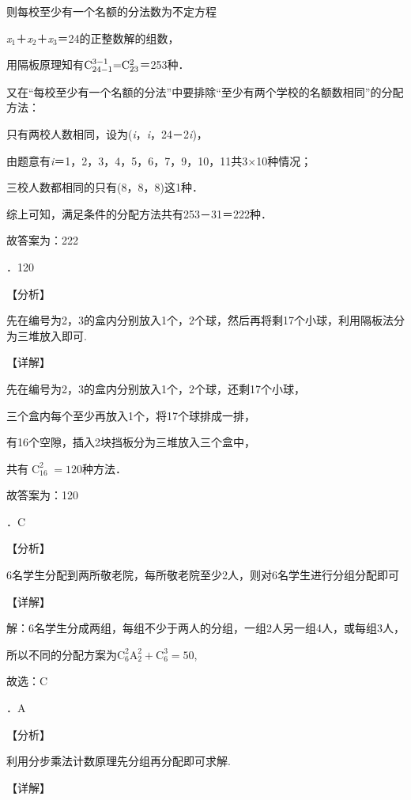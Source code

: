 \noindent 则每校至少有一个名额的分法数为不定方程

\noindent \textit{x}${}_{1}$＋\textit{x}${}_{2}$＋\textit{x}${}_{3}$＝24的正整数解的组数，

\noindent 用隔板原理知有$\mathrm C_{24-1}^{3{\rm -}1} {\rm =}\mathrm C_{23}^{2} $＝253种．

\noindent 又在``每校至少有一个名额的分法''中要排除``至少有两个学校的名额数相同''的分配方法：

\noindent 只有两校人数相同，设为(\textit{i}，\textit{i}，24－2\textit{i})，

\noindent 由题意有\textit{i}＝1，2，3，4，5，6，7，9，10，11共3$\mathrm{\times}$10种情况；

\noindent 三校人数都相同的只有(8，8，8)这1种．

\noindent 综上可知，满足条件的分配方法共有253－31＝222种．

\noindent 故答案为：222

．120

\noindent 【分析】

\noindent 先在编号为2，3的盒内分别放入1个，2个球，然后再将剩17个小球，利用隔板法分为三堆放入即可.

\noindent 【详解】

\noindent 先在编号为2，3的盒内分别放入1个，2个球，还剩17个小球，

\noindent 三个盒内每个至少再放入1个，将17个球排成一排，

\noindent 有16个空隙，插入2块挡板分为三堆放入三个盒中，

\noindent 共有$\mathop{C}\nolimits_{16}^{2} =120$种方法．

\noindent 故答案为：120

．C

\noindent 【分析】

\noindent 6名学生分配到两所敬老院，每所敬老院至少2人，则对6名学生进行分组分配即可

\noindent 【详解】

\noindent 解：6名学生分成两组，每组不少于两人的分组，一组2人另一组4人，或每组3人，

\noindent 所以不同的分配方案为$\mathrm C_{6}^{2} \mathrm A_{2}^{2} +\mathrm C_{6}^{3} =50$,

\noindent 故选：C

．A

\noindent 【分析】

\noindent 利用分步乘法计数原理先分组再分配即可求解.

\noindent 【详解】

